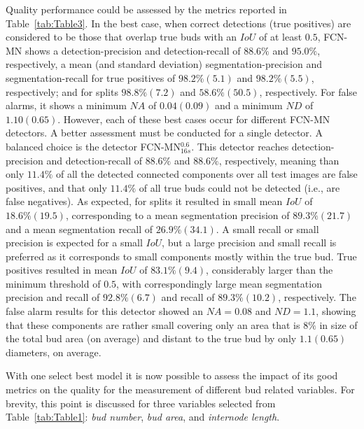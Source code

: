 \documentclass[a4paper,authoryear,review]{elsarticle}
\begin{document}
Quality performance could be assessed by the metrics reported in Table~\ref{tab:Table3}. In the best case, when correct detections (true positives) are considered to be those that overlap true buds with an $IoU$ of at least $0.5$, FCN-MN shows a detection-precision and detection-recall of $88.6\%$ and $95.0\%$, respectively, a mean (and standard deviation) segmentation-precision and segmentation-recall for true positives of $98.2\%(5.1)$ and $98.2\%(5.5)$, respectively; and for splits $98.8\%(7.2)$ and $58.6\%(50.5)$, respectively. For false alarms, it shows a minimum $NA$ of $0.04(0.09)$ and a minimum $ND$ of $1.10(0.65)$. 
However, each of these best cases occur for different FCN-MN detectors. A better assessment must be conducted for a single detector. A balanced choice is the detector FCN-MN$_{16s}^{0.6}$. This detector reaches detection-precision and detection-recall of $88.6\%$ and $88.6\%$, respectively, meaning than only $11.4\%$ of all the detected connected components over all test images are false positives, and that only $11.4\%$ of all true buds could not be detected (i.e., are false negatives).
%
As expected, for splits it resulted in small mean $IoU$ of $18.6\%(19.5)$, corresponding to a mean segmentation precision of $89.3\%(21.7)$ and a mean segmentation recall of $26.9\%(34.1)$. A small recall or small precision is expected for a small $IoU$, but a large precision and small recall is preferred as it corresponds to small components mostly within the true bud. True positives resulted in mean $IoU$ of $83.1\%(9.4)$, considerably larger than the minimum threshold of $0.5$, with correspondingly large mean segmentation precision and recall of $92.8\%(6.7)$ and recall of $89.3\%(10.2)$, respectively. 
%
The false alarm results for this detector showed an $NA=0.08$ and $ND=1.1$, showing that these components are rather small covering only an area that is $8\%$ in size of the total bud area (on average) and distant to the true bud by only $1.1 (0.65)$ diameters, on average.


With one select best model it is now possible to  assess the impact of its good metrics on the quality for the measurement of different bud related variables. For brevity, this point is discussed for three variables selected from Table~\ref{tab:Table1}: \emph{bud number}, \emph{bud area}, and \emph{internode length}.
\end{document}
